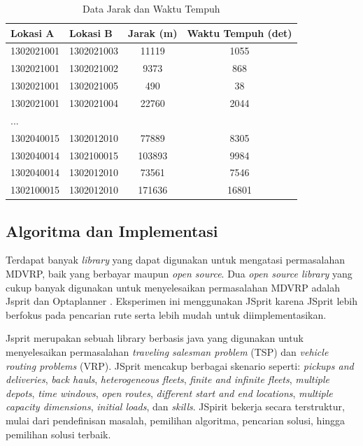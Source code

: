 \begin{table}[!]
	\centering
	\captionsetup{format=hang}
	\caption{Data Jarak dan Waktu Tempuh}
	\label{tbl:distance_duration_matrix}
	\begin{tabular}{llcc}
		\toprule
		Lokasi A & Lokasi B & Jarak (m) & Waktu Tempuh (det)\\
		\midrule
		1302021001 & 1302021003 & 11119 & 1055\\
		1302021001 & 1302021002 & 9373 & 868\\
		1302021001 & 1302021005 & 490 & 38\\
		1302021001 & 1302021004 & 22760 & 2044\\
		...\\
		1302040015 & 1302012010 & 77889 & 8305\\
		1302040014 & 1302100015 & 103893 & 9984\\
		1302040014 & 1302012010 & 73561 & 7546\\
		1302100015 & 1302012010 & 171636 & 16801\\
		\bottomrule
	\end{tabular}
\end{table}


\subsection{Algoritma dan Implementasi}
\label{ssec:alg-impl}
Terdapat banyak \textit{library} yang dapat digunakan untuk mengatasi permasalahan MDVRP, baik yang berbayar maupun \textit{open source}. Dua \textit{open source library} yang cukup banyak digunakan untuk menyelesaikan permasalahan MDVRP adalah Jsprit \citep{jsprit_jsprit_2014} dan Optaplanner \citep{optaplanner_constraint_2016}. Eksperimen ini menggunakan JSprit karena JSprit lebih berfokus pada pencarian rute serta lebih mudah untuk diimplementasikan. 


Jsprit merupakan sebuah library berbasis java yang digunakan untuk menyelesaikan permasalahan \textit{traveling salesman problem} (TSP) dan \textit{vehicle routing problems} (VRP). JSprit mencakup berbagai skenario seperti: \textit{pickups and deliveries}, \textit{back hauls}, \textit{heterogeneous fleets}, \textit{finite and infinite fleets}, \textit{multiple depots}, \textit{time windows}, \textit{open routes}, \textit{different start and end locations}, \textit{multiple capacity dimensions}, \textit{initial loads}, dan \textit{skills}. JSpirit bekerja secara terstruktur, mulai dari pendefinisan masalah, pemilihan algoritma, pencarian solusi, hingga pemilihan solusi terbaik.



